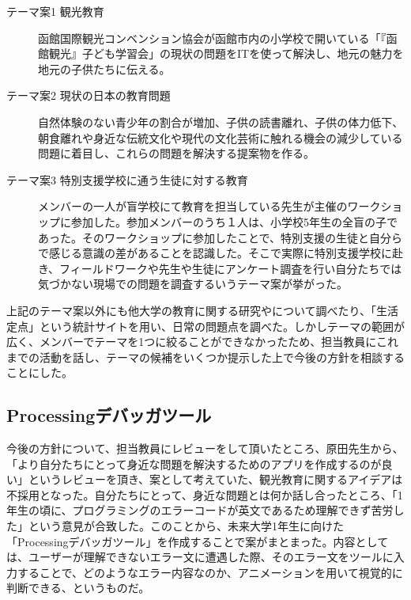 \documentclass[openany,11pt,papersize]{jsbook}
\begin{document}
\begin{description}
 \item[テーマ案1 観光教育]
函館国際観光コンベンション協会が函館市内の小学校で開いている「『函館観光』子ども学習会」の現状の問題をITを使って解決し、地元の魅力を地元の子供たちに伝える。

 
 \item[テーマ案2 現状の日本の教育問題]
自然体験のない青少年の割合が増加、子供の読書離れ、子供の体力低下、朝食離れや身近な伝統文化や現代の文化芸術に触れる機会の減少している問題に着目し、これらの問題を解決する提案物を作る。
  
\item[テーマ案3 特別支援学校に通う生徒に対する教育]
  メンバーの一人が盲学校にて教育を担当している先生が主催のワークショップに参加した。参加メンバーのうち１人は、小学校5年生の全盲の子であった。そのワークショップに参加したことで、特別支援の生徒と自分らで感じる意識の差があることを認識した。そこで実際に特別支援学校に赴き、フィールドワークや先生や生徒にアンケート調査を行い自分たちでは気づかない現場での問題を調査するいうテーマ案が挙がった。
	
 \end{description}

上記のテーマ案以外にも他大学の教育に関する研究やについて調べたり、「生活定点」という統計サイトを用い、日常の問題点を調べた。しかしテーマの範囲が広く、メンバーでテーマを1つに絞ることができなかったため、担当教員にこれまでの活動を話し、テーマの候補をいくつか提示した上で今後の方針を相談することにした。


\subsection{Processingデバッガツール}
\par 今後の方針について、担当教員にレビューをして頂いたところ、原田先生から、「より自分たちにとって身近な問題を解決するためのアプリを作成するのが良い」というレビューを頂き、案として考えていた、観光教育に関するアイデアは不採用となった。自分たちにとって、身近な問題とは何か話し合ったところ、「1年生の頃に、プログラミングのエラーコードが英文であるため理解できず苦労した」という意見が合致した。このことから、未来大学1年生に向けた「Processingデバッガツール」を作成することで案がまとまった。内容としては、ユーザーが理解できないエラー文に遭遇した際、そのエラー文をツールに入力することで、どのようなエラー内容なのか、アニメーションを用いて視覚的に判断できる、というものだ。
\end{document}
